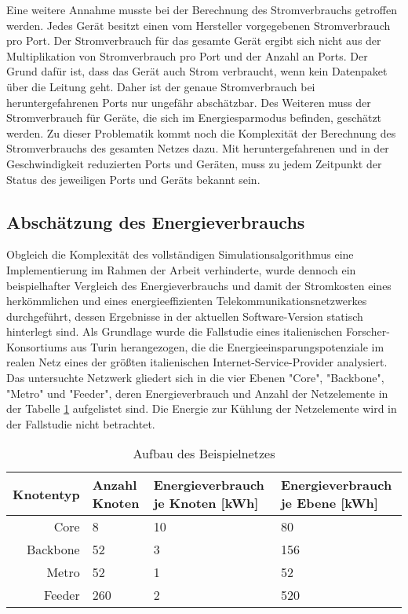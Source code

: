 Eine weitere Annahme musste bei der Berechnung des Stromverbrauchs getroffen werden. Jedes Gerät besitzt einen vom Hersteller vorgegebenen Stromverbrauch pro Port. Der Stromverbrauch für das gesamte Gerät ergibt sich nicht aus der Multiplikation von Stromverbrauch pro Port und der Anzahl an Ports. Der Grund dafür ist, dass das Gerät auch Strom verbraucht, wenn kein Datenpaket über die Leitung geht. Daher ist der genaue Stromverbrauch bei heruntergefahrenen Ports nur ungefähr abschätzbar. Des Weiteren  muss der Stromverbrauch für Geräte, die sich im Energiesparmodus befinden, geschätzt werden. Zu dieser Problematik kommt noch die Komplexität der Berechnung des Stromverbrauchs des gesamten Netzes dazu. Mit heruntergefahrenen und in der Geschwindigkeit reduzierten Ports und Geräten, muss zu jedem Zeitpunkt der Status des jeweiligen Ports und Geräts bekannt sein.  


\subsection{Abschätzung des Energieverbrauchs} \label{subsec:VorgSch}

Obgleich die Komplexität des vollständigen Simulationsalgorithmus eine Implementierung im Rahmen der Arbeit verhinderte, wurde dennoch ein beispielhafter Vergleich des Energieverbrauchs und damit der Stromkosten eines herkömmlichen und eines energieeffizienten Telekommunikationsnetzwerkes durchgeführt, dessen Ergebnisse in der aktuellen Software-Version statisch hinterlegt sind. Als Grundlage wurde die Fallstudie eines italienischen Forscher-Konsortiums aus Turin herangezogen, die die Energieeinsparungspotenziale im realen Netz eines der größten italienischen Internet-Service-Provider analysiert\cite{Chiaraviglio2009}. Das untersuchte Netzwerk gliedert sich in die vier Ebenen "Core", "Backbone", "Metro" und "Feeder", deren Energieverbrauch und Anzahl der Netzelemente in der Tabelle \ref{tab:beispielnetz} aufgelistet sind\cite[2]{Chiaraviglio2009}. Die Energie zur Kühlung der Netzelemente wird in der Fallstudie nicht betrachtet.




\begin{table}[ht]
\centering
\caption{Aufbau des Beispielnetzes}
\label{tab:beispielnetz}
\begin{tabularx}{\textwidth}{ | r | l | X | X | }
	\hline
	\textbf{Knotentyp} & \textbf{Anzahl Knoten} & \textbf{Energieverbrauch \newline je Knoten [kWh]} & \textbf{Energieverbrauch \newline je Ebene [kWh]}\\ \hline\hline
Core & 8 & 10 & 80\\ \hline
Backbone & 52 & 3 & 156\\ \hline
Metro & 52 & 1 & 52\\ \hline
Feeder & 260 & 2 & 520\\ \hline
\end{tabularx}
\end{table}

